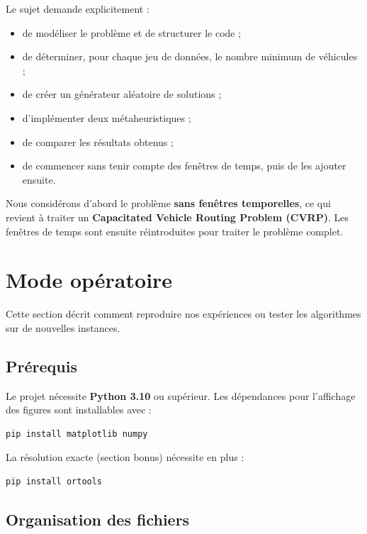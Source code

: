 \documentclass[11pt,a4paper]{article}
\begin{document}
Le sujet demande explicitement :
\begin{itemize}
    \item de modéliser le problème et de structurer le code ;
    \item de déterminer, pour chaque jeu de données, le nombre minimum de véhicules ;
    \item de créer un générateur aléatoire de solutions ;
    \item d'implémenter deux métaheuristiques ;
    \item de comparer les résultats obtenus ;
    \item de commencer sans tenir compte des fenêtres de temps, puis de les ajouter ensuite.
\end{itemize}

Nous considérons d'abord le problème \textbf{sans fenêtres temporelles}, ce qui revient à traiter un \textbf{Capacitated Vehicle Routing Problem (CVRP)}. Les fenêtres de temps sont ensuite réintroduites pour traiter le problème complet.

\section{Mode opératoire}
\label{sec:modeop}

Cette section décrit comment reproduire nos expériences ou tester les algorithmes sur de nouvelles instances.

\subsection{Prérequis}

Le projet nécessite \textbf{Python 3.10} ou supérieur. Les dépendances pour l'affichage des figures sont installables avec :

\begin{lstlisting}
pip install matplotlib numpy
\end{lstlisting}

La résolution exacte (section bonus) nécessite en plus :

\begin{lstlisting}
pip install ortools
\end{lstlisting}

\subsection{Organisation des fichiers}
\end{document}
